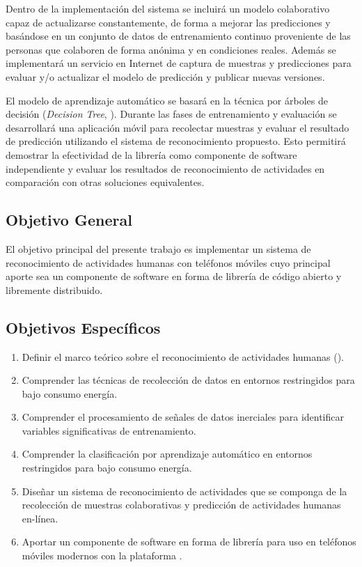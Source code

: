 Dentro de la implementación del sistema  se incluirá un
modelo colaborativo capaz de actualizarse constantemente, de forma
a mejorar las predicciones y basándose en un conjunto de datos de
entrenamiento continuo proveniente de las personas que colaboren de
forma anónima y en condiciones reales. Además se implementará un servicio
en Internet de captura de muestras y predicciones para evaluar y/o
actualizar el modelo de predicción y publicar nuevas versiones. 

El modelo de aprendizaje automático se basará en la técnica por árboles
de decisión (\emph{Decision Tree}, ). Durante las fases
de entrenamiento y evaluación se desarrollará una aplicación móvil
para recolectar muestras y evaluar el resultado de predicción utilizando
el sistema de reconocimiento propuesto. Esto permitirá demostrar la
efectividad de la librería como componente de software independiente
y evaluar los resultados de reconocimiento de actividades en comparación
con otras soluciones equivalentes. 

\subsection{Objetivo General}

\label{sec13:objetivo-general}El objetivo principal del presente
trabajo es implementar un sistema de reconocimiento de actividades
humanas con teléfonos móviles cuyo principal aporte sea un componente
de software en forma de librería de código abierto y libremente distribuido.

\subsection{Objetivos Específicos}

\label{sec13:objetivos-especuxedficos}
\begin{enumerate}
\item \label{enu:obe1}Definir el marco teórico sobre el reconocimiento
de actividades humanas (). 
\item \label{enu:obe2}Comprender las técnicas de recolección de datos en
entornos restringidos para bajo consumo energía. 
\item \label{enu:obe3}Comprender el procesamiento de señales de datos inerciales
para identificar variables significativas de entrenamiento. 
\item \label{enu:obe4}Comprender la clasificación por aprendizaje automático
en entornos restringidos para bajo consumo energía. 
\item \label{enu:obe5}Diseñar un sistema de reconocimiento de actividades
que se componga de la recolección de muestras colaborativas y predicción
de actividades humanas en-línea. 
\item \label{enu:obe6}Aportar un componente de software en forma de librería
para uso en teléfonos móviles modernos con la plataforma . 
\end{enumerate}

